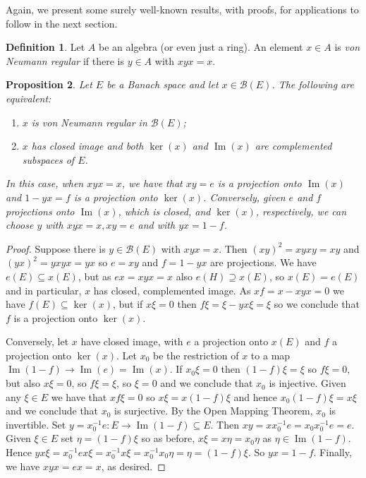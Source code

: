 \documentclass[twoside,a4paper,12pt]{article}
\theoremstyle{plain}
\newtheorem{proposition}{Proposition}[section]
\theoremstyle{definition}
\newtheorem{definition}[proposition]{Definition}
\newcommand{\mc}{\mathcal}
\newcommand{\im}{\operatorname{Im}}
\begin{document}
Again, we present some surely well-known results, with proofs, for applications to follow in the next section.

\begin{definition}
Let $A$ be an algebra (or even just a ring).  An element $x\in A$ is \emph{von Neumann regular} if there is $y\in A$ with $xyx = x$.
\end{definition}

\begin{proposition}
Let $E$ be a Banach space and let $x\in \mc B(E)$.  The following are equivalent:
\begin{enumerate}
   \item
   $x$ is von Neumann regular in $\mc B(E)$;
   \item 
   $x$ has closed image and both $\ker(x)$ and $\im(x)$ are complemented subspaces of $E$.
\end{enumerate}
In this case, when $xyx=x$, we have that $xy = e$ is a projection onto $\im(x)$ and $1-yx = f$ is a projection onto $\ker(x)$.  Conversely, given $e$ and $f$ projections onto $\im(x)$, which is closed, and $\ker(x)$, respectively, we can choose $y$ with $xyx=x, xy=e$ and with $yx=1-f$.
\end{proposition}
\begin{proof}
Suppose there is $y\in\mc B(E)$ with $xyx=x$.  Then $(xy)^2 = xyxy = xy$ and $(yx)^2 = yxyx = yx$ so $e=xy$ and $f=1-yx$ are projections.  We have $e(E) \subseteq x(E)$, but as $ex = xyx = x$ also $e(H) \supseteq x(E)$, so $x(E)=e(E)$ and in particular, $x$ has closed, complemented image.  As $xf = x - xyx = 0$ we have $f(E) \subseteq \ker(x)$, but if $x\xi=0$ then $f\xi = \xi - yx\xi = \xi$ so we conclude that $f$ is a projection onto $\ker(x)$.

Conversely, let $x$ have closed image, with $e$ a projection onto $x(E)$ and $f$ a projection onto $\ker(x)$.  Let $x_0$ be the restriction of $x$ to a map $\im(1-f) \to \im(e) = \im(x)$.  If $x_0\xi=0$ then $(1-f)\xi=\xi$ so $f\xi=0$, but also $x\xi=0$, so $f\xi=\xi$, so $\xi=0$ and we conclude that $x_0$ is injective.  Given any $\xi\in E$ we have that $xf\xi=0$ so $x\xi = x(1-f)\xi$ and hence $x_0(1-f)\xi = x\xi$ and we conclude that $x_0$ is surjective.  By the Open Mapping Theorem, $x_0$ is invertible.  Set $y = x_0^{-1} e \colon E \to \im(1-f) \subseteq E$.  Then $xy = x x_0^{-1} e = x_0 x_0^{-1} e = e$.  Given $\xi\in E$ set $\eta = (1-f)\xi$ so as before, $x\xi = x\eta = x_0\eta$ as $\eta\in\im(1-f)$.  Hence $yx\xi = x_0^{-1} ex\xi = x_0^{-1} x\xi = x_0^{-1} x_0 \eta = \eta = (1-f)\xi$.  So $yx = 1-f$.  Finally, we have $xyx = ex = x$, as desired.
\end{proof}
\end{document}
